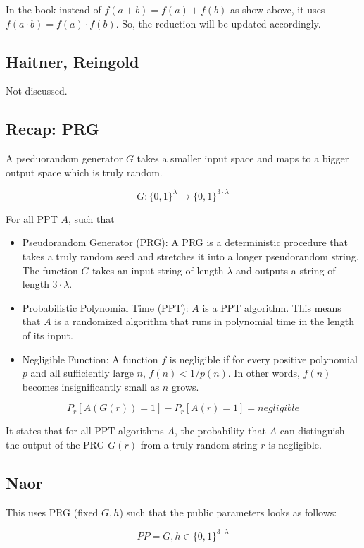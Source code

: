 \documentclass{article}
\begin{document}
In the book instead of $f(a+b) = f(a) + f(b)$ as show above, it uses $f(a \cdot b) = f(a) \cdot f(b)$. So, the reduction will be updated accordingly.

\subsection{Haitner, Reingold}

Not discussed.

\subsection{Recap: PRG}

A pseduorandom generator $G$ takes a smaller input space and maps to a bigger output space which is truly random.

$$
G:\{0,1\}^{\lambda} \rightarrow \{0,1\}^{3\cdot \lambda}
$$

For all PPT $A$, such that

\begin{itemize}
    \item Pseudorandom Generator (PRG): A PRG is a deterministic procedure that takes a truly random seed and stretches it into a longer pseudorandom string. The function $G$ takes an input string of length $\lambda$ and outputs a string of length $3\cdot \lambda$.
    \item Probabilistic Polynomial Time (PPT): $A$ is a PPT algorithm. This means that $A$ is a randomized algorithm that runs in polynomial time in the length of its input.
    \item Negligible Function: A function $f$ is negligible if for every positive polynomial $p$ and all sufficiently large $n$, $f(n) < 1/p(n)$. In other words, $f(n)$ becomes insignificantly small as $n$ grows.
\end{itemize}


$$
P_r[A(G(r)) = 1] - P_r[A(r) = 1] = negligible
$$

It states that for all PPT algorithms $A$, the probability that $A$ can distinguish the output of the PRG $G(r)$ from a truly random string $r$ is negligible. 

\subsection{Naor}

This uses PRG (fixed $G, h$) such that the public parameters looks as follows:

$$PP = G, h \in \{0,1\}^{3 \cdot \lambda}$$
\end{document}
